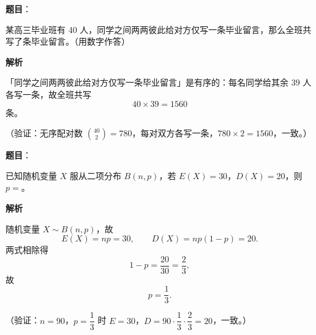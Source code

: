 \begin{answer}

\textbf{题目}：

某高三毕业班有 40 人，同学之间两两彼此给对方仅写一条毕业留言，那么全班共写了\gkblank{}条毕业留言。（用数字作答）

\textbf{解析}

「同学之间两两彼此给对方仅写一条毕业留言」是有序的：每名同学给其余 \(39\) 人各写一条，故全班共写
\nopagebreak[4]
\[
40\times39=1560
\]
条。

（验证：无序配对数 \(\binom{40}{2}=780\)，每对双方各写一条，\(780\times2=1560\)，一致。）


\end{answer}
\begin{answer}

\textbf{题目}：

已知随机变量 \(X\) 服从二项分布 \(B(n,p)\)，若 \(E(X)=30\)，\(D(X)=20\)，则 \(p=\)\gkblank{}。

\textbf{解析}

随机变量 \(X\sim B(n,p)\)，故
\nopagebreak[4]
\[
E(X)=np=30,\qquad D(X)=np(1-p)=20.
\]
两式相除得
\nopagebreak[4]
\[
1-p=\frac{20}{30}=\frac23,
\]
故
\nopagebreak[4]
\[
p=\frac13.
\]

（验证：\(n=90\)，\(p=\dfrac13\) 时 \(E=30\)，\(D=90\cdot\dfrac13\cdot\dfrac23=20\)，一致。）


\end{answer}
